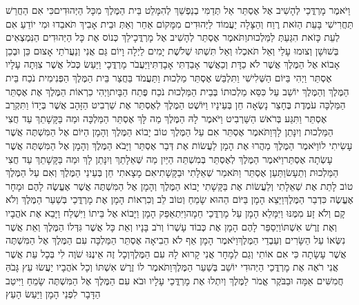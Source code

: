 \documentclass[../main/main.tex]{subfiles}
\begin{document}
\begin{multicols*}{\ncols}
וַיֹּאמֶר מָרְדֳּכַי לְהָשִׁיב אֶל אֶסְתֵּר אַל תְּדַמִּי בְנַפְשֵׁךְ לְהִמָּלֵט בֵּית הַמֶּלֶךְ מִכָּל הַיְּהוּדִים\PreVerseSpace{}כִּי אִם הַחֲרֵשׁ תַּחֲרִישִׁי בָּעֵת הַזֹּאת רֶוַח וְהַצָּלָה יַעֲמוֹד לַיְּהוּדִים מִמָּקוֹם אַחֵר וְאַתְּ וּבֵית אָבִיךְ תֹּאבֵדוּ וּמִי יוֹדֵעַ אִם לְעֵת כָּזֹאת הִגַּעַתְּ לַמַּלְכוּת\PreVerseSpace{}וַתֹּאמֶר אֶסְתֵּר לְהָשִׁיב אֶל מָרְדֳּכָי\PreVerseSpace{}לֵךְ כְּנוֹס אֶת כָּל הַיְּהוּדִים הַנִּמְצְאִים בְּשׁוּשָׁן וְצוּמוּ עָלַי וְאַל תֹּאכְלוּ וְאַל תִּשְׁתּוּ שְׁלֹשֶׁת יָמִים לַיְלָה וָיוֹם גַּם אֲנִי וְנַעֲרֹתַי אָצוּם כֵּן וּבְכֵן אָבוֹא אֶל הַמֶּלֶךְ אֲשֶׁר לֹא כַדָּת וְכַאֲשֶׁר אָבַדְתִּי אָבָדְתִּי\PreVerseSpace{}וַיַּעֲבֹר מָרְדֳּכָי וַיַּעַשׂ כְּכֹל אֲשֶׁר צִוְּתָה עָלָיו אֶסְתֵּר \ClosedSection{}וַיְהִי בַּיּוֹם הַשְּׁלִישִׁי וַתִּלְבַּשׁ אֶסְתֵּר מַלְכוּת וַתַּעֲמֹד בַּחֲצַר בֵּית הַמֶּלֶךְ הַפְּנִימִית נֹכַח בֵּית הַמֶּלֶךְ וְהַמֶּלֶךְ יוֹשֵׁב עַל כִּסֵּא מַלְכוּתוֹ בְּבֵית הַמַּלְכוּת נֹכַח פֶּתַח הַבָּיִת\PreVerseSpace{}וַיְהִי כִרְאוֹת הַמֶּלֶךְ אֶת אֶסְתֵּר הַמַּלְכָּה עֹמֶדֶת בֶּחָצֵר נָשְׂאָה חֵן בְּעֵינָיו וַיּוֹשֶׁט הַמֶּלֶךְ לְאֶסְתֵּר אֶת שַׁרְבִיט הַזָּהָב אֲשֶׁר בְּיָדוֹ וַתִּקְרַב אֶסְתֵּר וַתִּגַּע בְּרֹאשׁ הַשַּׁרְבִיט \ClosedSection{}וַיֹּאמֶר לָהּ הַמֶּלֶךְ מַה לָּךְ אֶסְתֵּר הַמַּלְכָּה וּמַה בַּקָּשָׁתֵךְ עַד חֲצִי הַמַּלְכוּת וְיִנָּתֵן לָךְ\PreVerseSpace{}וַתֹּאמֶר אֶסְתֵּר אִם עַל הַמֶּלֶךְ טוֹב יָבוֹא הַמֶּלֶךְ וְהָמָן הַיּוֹם אֶל הַמִּשְׁתֶּה אֲשֶׁר עָשִׂיתִי לוֹ\PreVerseSpace{}וַיֹּאמֶר הַמֶּלֶךְ מַהֲרוּ אֶת הָמָן לַעֲשׂוֹת אֶת דְּבַר אֶסְתֵּר וַיָּבֹא הַמֶּלֶךְ וְהָמָן אֶל הַמִּשְׁתֶּה אֲשֶׁר עָשְׂתָה אֶסְתֵּר\PreVerseSpace{}וַיֹּאמֶר הַמֶּלֶךְ לְאֶסְתֵּר בְּמִשְׁתֵּה הַיַּיִן מַה שְּׁאֵלָתֵךְ וְיִנָּתֵן לָךְ וּמַה בַּקָּשָׁתֵךְ עַד חֲצִי הַמַּלְכוּת וְתֵעָשׂ\PreVerseSpace{}וַתַּעַן אֶסְתֵּר וַתֹּאמַר שְׁאֵלָתִי וּבַקָּשָׁתִי\PreVerseSpace{}אִם מָצָאתִי חֵן בְּעֵינֵי הַמֶּלֶךְ וְאִם עַל הַמֶּלֶךְ טוֹב לָתֵת אֶת שְׁאֵלָתִי וְלַעֲשׂוֹת אֶת בַּקָּשָׁתִי יָבוֹא הַמֶּלֶךְ וְהָמָן אֶל הַמִּשְׁתֶּה אֲשֶׁר אֶעֱשֶׂה לָהֶם וּמָחָר אֶעֱשֶׂה כִּדְבַר הַמֶּלֶךְ\PreVerseSpace{}וַיֵּצֵא הָמָן בַּיּוֹם הַהוּא שָׂמֵחַ וְטוֹב לֵב וְכִרְאוֹת הָמָן אֶת מָרְדֳּכַי בְּשַׁעַר הַמֶּלֶךְ וְלֹא קָם וְלֹא זָע מִמֶּנּוּ וַיִּמָּלֵא הָמָן עַל מָרְדֳּכַי חֵמָה\PreVerseSpace{}וַיִּתְאַפַּק הָמָן וַיָּבוֹא אֶל בֵּיתוֹ וַיִּשְׁלַח וַיָּבֵא אֶת אֹהֲבָיו וְאֶת זֶרֶשׁ אִשְׁתּוֹ\PreVerseSpace{}וַיְסַפֵּר לָהֶם הָמָן אֶת כְּבוֹד עָשְׁרוֹ וְרֹב בָּנָיו וְאֵת כָּל אֲשֶׁר גִּדְּלוֹ הַמֶּלֶךְ וְאֵת אֲשֶׁר נִשְּׂאוֹ עַל הַשָּׂרִים וְעַבְדֵי הַמֶּלֶךְ\PreVerseSpace{}וַיֹּאמֶר הָמָן אַף לֹא הֵבִיאָה אֶסְתֵּר הַמַּלְכָּה עִם הַמֶּלֶךְ אֶל הַמִּשְׁתֶּה אֲשֶׁר עָשָׂתָה כִּי אִם אוֹתִי וְגַם לְמָחָר אֲנִי קָרוּא לָהּ עִם הַמֶּלֶךְ\PreVerseSpace{}וְכָל זֶה אֵינֶנּוּ שֹׁוֶה לִי בְּכָל עֵת אֲשֶׁר אֲנִי רֹאֶה אֶת מָרְדֳּכַי הַיְּהוּדִי יוֹשֵׁב בְּשַׁעַר הַמֶּלֶךְ\PreVerseSpace{}וַתֹּאמֶר לוֹ זֶרֶשׁ אִשְׁתּוֹ וְכָל אֹהֲבָיו יַעֲשׂוּ עֵץ גָּבֹהַּ חֲמִשִּׁים אַמָּה וּבַבֹּקֶר אֱמֹר לַמֶּלֶךְ וְיִתְלוּ אֶת מָרְדֳּכַי עָלָיו וּבֹא עִם הַמֶּלֶךְ אֶל הַמִּשְׁתֶּה שָׂמֵחַ וַיִּיטַב הַדָּבָר לִפְנֵי הָמָן וַיַּעַשׂ הָעֵץ\OpenSection{}\par

\end{multicols*}
\end{document}
